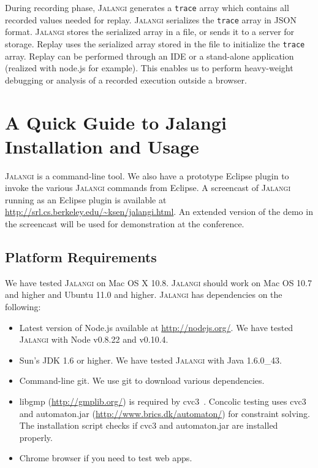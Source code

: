 \documentclass{sig-alternate}
\def\jalangi{\textsc{Jalangi}}
\begin{document}
During recording phase, \jalangi{} generates a \texttt{trace} array
which contains all recorded values needed for replay.  \jalangi{}
serializes the \texttt{trace} array in JSON format.  \jalangi{} stores
the serialized array in a file, or sends it to a server for storage.
Replay uses the serialized array stored in the file to initialize the
\texttt{trace} array. Replay can be performed through an IDE or a
stand-alone application (realized with node.js for example). This
enables us to perform heavy-weight debugging or analysis of a recorded
execution outside a browser.

\section{A Quick Guide to Jalangi Installation and Usage}
\label{sec:usage}

\jalangi{} is a command-line tool.  We also have a prototype Eclipse
plugin to invoke the various \jalangi{} commands from Eclipse.  A
screencast of \jalangi{} running as an Eclipse plugin is available at
\url{http://srl.cs.berkeley.edu/~ksen/jalangi.html}.  An extended
version of the demo in the screencast will be used for demonstration
at the conference.

\subsection{Platform Requirements}
\label{sec:platf-requ}

We have tested \jalangi{} on Mac OS X 10.8. \jalangi{} should work on
Mac OS 10.7 and higher and Ubuntu 11.0 and higher.  \jalangi{} has
dependencies on the following:

\begin{itemize}
\item Latest version of Node.js available at
  \url{http://nodejs.org/}. We have tested \jalangi{} with Node v0.8.22
  and v0.10.4.
\item Sun's JDK 1.6 or higher. We have tested \jalangi{} with Java
  1.6.0\_43.
\item Command-line git.  We use git to download various dependencies.
\item libgmp (\url{http://gmplib.org/}) is required by
  cvc3~\cite{BT07}. Concolic testing uses cvc3 and automaton.jar
  (\url{http://www.brics.dk/automaton/}) for constraint solving. The
  installation script checks if cvc3 and automaton.jar are installed
  properly.
\item Chrome browser if you need to test web apps.
\end{itemize}
\end{document}
